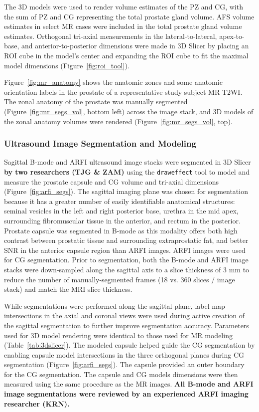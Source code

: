 The 3D models were used to render volume estimates of the PZ and CG, with the
sum of PZ and CG representing the total prostate gland volume. AFS volume
estimates in select MR cases were included in the total prostate gland volume
estimates. Orthogonal tri-axial measurements in the lateral-to-lateral,
apex-to-base, and anterior-to-posterior dimensions were made in 3D Slicer by
placing an ROI cube in the model's center and expanding the ROI cube to fit the
maximal model dimensions (Figure~\ref{fig:roi_tool}). 



Figure~\ref{fig:mr_anatomy} shows the anatomic zones and some anatomic
orientation labels in the prostate of a representative study subject MR T2WI.
The zonal anatomy of the prostate was manually segmented
(Figure~\ref{fig:mr_segs_vol}, bottom left) across the image stack, and 3D
models of the zonal anatomy volumes were rendered
(Figure~\ref{fig:mr_segs_vol}, top).



\subsubsection{Ultrasound Image Segmentation and Modeling}
Sagittal B-mode and ARFI ultrasound image stacks were segmented in 3D Slicer
\textbf{by two researchers (TJG \& ZAM)} using the \verb+draweffect+ tool to
model and measure the prostate capsule and CG volume and tri-axial dimensions
(Figure~\ref{fig:arfi_segs}).   The sagittal imaging plane was chosen for
segmentation because it has a greater number of easily identifiable anatomical
structures:  seminal vesicles in the left and right posterior base, urethra in
the mid apex, surrounding fibromuscular tissue in the anterior, and rectum in
the posterior. Prostate capsule was segmented in B-mode as this modality offers
both high contrast between prostatic tissue and surrounding extraprostatic fat,
and better SNR in the anterior capsule region than ARFI images. ARFI images
were used for CG segmentation.  Prior to segmentation, both the B-mode and ARFI
image stacks were down-sampled along the sagittal axis to a slice thickness of
3 mm to reduce the number of manually-segmented frames (18 vs. 360 slices /
image stack) and match the MRI slice thickness. 

While segmentations were performed along the sagittal plane, label map
intersections in the axial and coronal views were used during active creation
of the sagittal segmentation to further improve segmentation accuracy.
Parameters used for 3D model rendering were identical to those used for MR
modeling (Table~\ref{tab:3dslicer}).  The modeled capsule helped guide the CG
segmentation by enabling capsule model intersections in the three orthogonal
planes during CG segmentation (Figure~\ref{fig:arfi_segs}). The capsule
provided an outer boundary for the CG segmentation. The capsule and CG models
dimensions were then measured using the same procedure as the MR images.
\textbf{All B-mode and ARFI image segmentations were reviewed by an experienced
    ARFI imaging researcher (KRN).}



